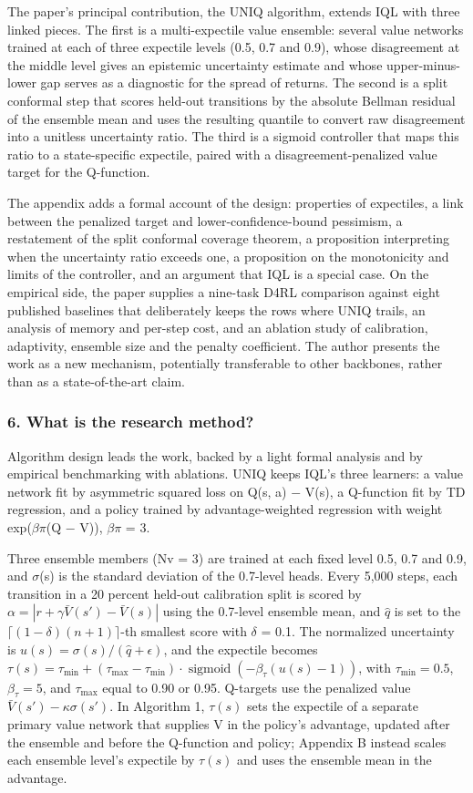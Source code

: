 \documentclass[11pt]{article}
\newcommand{\question}[1]{\subsubsection*{#1}}
\begin{document}
The paper's principal contribution, the UNIQ algorithm, extends IQL with three linked pieces. The first is a multi-expectile value ensemble: several value networks trained at each of three expectile levels (0.5, 0.7 and 0.9), whose disagreement at the middle level gives an epistemic uncertainty estimate and whose upper-minus-lower gap serves as a diagnostic for the spread of returns. The second is a split conformal step that scores held-out transitions by the absolute Bellman residual of the ensemble mean and uses the resulting quantile to convert raw disagreement into a unitless uncertainty ratio. The third is a sigmoid controller that maps this ratio to a state-specific expectile, paired with a disagreement-penalized value target for the Q-function.

The appendix adds a formal account of the design: properties of expectiles, a link between the penalized target and lower-confidence-bound pessimism, a restatement of the split conformal coverage theorem, a proposition interpreting when the uncertainty ratio exceeds one, a proposition on the monotonicity and limits of the controller, and an argument that IQL is a special case. On the empirical side, the paper supplies a nine-task D4RL comparison against eight published baselines that deliberately keeps the rows where UNIQ trails, an analysis of memory and per-step cost, and an ablation study of calibration, adaptivity, ensemble size and the penalty coefficient. The author presents the work as a new mechanism, potentially transferable to other backbones, rather than as a state-of-the-art claim.

\question{6. What is the research method?}

Algorithm design leads the work, backed by a light formal analysis and by empirical benchmarking with ablations. UNIQ keeps IQL's three learners: a value network fit by asymmetric squared loss on Q(s, a) \ensuremath{-} V(s), a Q-function fit by TD regression, and a policy trained by advantage-weighted regression with weight exp(\ensuremath{\beta}\ensuremath{\pi}(Q \ensuremath{-} V)), \ensuremath{\beta}\ensuremath{\pi} = 3.

Three ensemble members (Nv = 3) are trained at each fixed level 0.5, 0.7 and 0.9, and \ensuremath{\sigma}(s) is the standard deviation of the 0.7-level heads. Every 5,000 steps, each transition in a 20 percent held-out calibration split is scored by $\alpha = |r + \gamma \bar{V}(s') - \bar{V}(s)|$ using the 0.7-level ensemble mean, and $\hat{q}$ is set to the $\lceil (1 - \delta)(n + 1) \rceil$-th smallest score with \ensuremath{\delta} = 0.1. The normalized uncertainty is $u(s) = \sigma(s)/(\hat{q} + \epsilon)$, and the expectile becomes $\tau(s) = \tau_{\min} + (\tau_{\max} - \tau_{\min}) \cdot \operatorname{sigmoid}(-\beta_\tau(u(s) - 1))$, with $\tau_{\min} = 0.5$, $\beta_\tau = 5$, and $\tau_{\max}$ equal to 0.90 or 0.95. Q-targets use the penalized value $\bar{V}(s') - \kappa\sigma(s')$. In Algorithm 1, $\tau(s)$ sets the expectile of a separate primary value network that supplies V in the policy's advantage, updated after the ensemble and before the Q-function and policy; Appendix B instead scales each ensemble level's expectile by $\tau(s)$ and uses the ensemble mean in the advantage.
\end{document}
